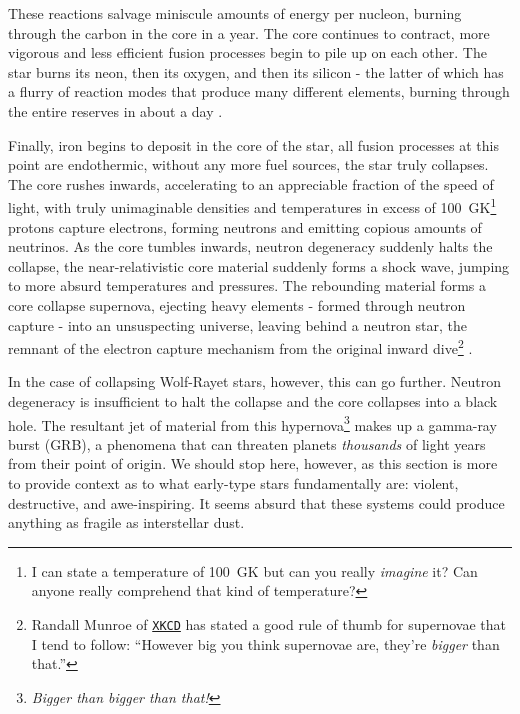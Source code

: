 \noindent
These reactions salvage miniscule amounts of energy per nucleon, burning through the carbon in the core in a year.
The core continues to contract, more vigorous and less efficient fusion processes begin to pile up on each other.
The star burns its neon, then its oxygen, and then its silicon - the latter of which has a flurry of reaction modes that produce many different elements, burning through the entire reserves in about a day
\parencite[Ch.~6]{ryanStellarEvolutionNucleosynthesis2010a}.

Finally, iron begins to deposit in the core of the star, all fusion processes at this point are endothermic, without any more fuel sources, the star truly collapses.
The core rushes inwards, accelerating to an appreciable fraction of the speed of light, with truly unimaginable densities and temperatures in excess of \SI{100}{\giga\kelvin}\footnote{I can state a temperature of \SI{100}{\giga\kelvin} but can you really \emph{imagine} it? Can anyone really comprehend that kind of temperature?} protons capture electrons, forming neutrons and emitting copious amounts of neutrinos.
As the core tumbles inwards, neutron degeneracy suddenly halts the collapse, the near-relativistic core material suddenly forms a shock wave, jumping to more absurd temperatures and pressures.
The rebounding material forms a core collapse supernova, ejecting heavy elements - formed through neutron capture - into an unsuspecting universe, leaving behind a neutron star, the remnant of the electron capture mechanism from the original inward dive\footnote{Randall Munroe of \href{https://what-if.xkcd.com/73/}{\texttt{XKCD}} has stated a good rule of thumb for supernovae that I tend to follow: ``However big you think supernovae are, they're \emph{bigger} than that.''} \parencite[Ch.~13]{longairHighEnergyAstrophysics2011}.

In the case of collapsing Wolf-Rayet stars, however, this can go further.
Neutron degeneracy is insufficient to halt the collapse and the core collapses into a black hole.
The resultant jet of material from this hypernova\footnote{\emph{Bigger than bigger than that!}} makes up a gamma-ray burst (GRB), a phenomena that can threaten planets \emph{thousands} of light years from their point of origin.
We should stop here, however, as this section is more to provide context as to what early-type stars fundamentally are: violent, destructive, and awe-inspiring.
It seems absurd that these systems could produce anything as fragile as interstellar dust.


